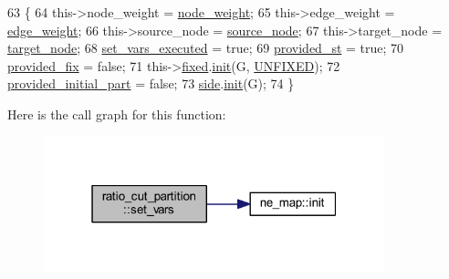 \begin{DoxyCode}
63 \{
64     this->node\_weight = \mbox{\hyperlink{classratio__cut__partition_a4d9d2a9317a062f839ea7155c37b173f}{node\_weight}};
65     this->edge\_weight = \mbox{\hyperlink{classratio__cut__partition_a48a85c82fb09b83c9d494d6d1232fab2}{edge\_weight}};
66     this->source\_node = \mbox{\hyperlink{classratio__cut__partition_abb18c3acafc590e258453d7a8d86bb49}{source\_node}};
67     this->target\_node = \mbox{\hyperlink{classratio__cut__partition_a343ba76869e64141fb795010e388744b}{target\_node}};
68     \mbox{\hyperlink{classratio__cut__partition_aa722d032cb59664894c6301ceee86729}{set\_vars\_executed}} = \textcolor{keyword}{true};
69     \mbox{\hyperlink{classratio__cut__partition_a248512624766f0b21d154b4841c95a1d}{provided\_st}} = \textcolor{keyword}{true};
70     \mbox{\hyperlink{classratio__cut__partition_a5f1f85feae589f7d39da48a412c90376}{provided\_fix}} = \textcolor{keyword}{false};
71     this->\mbox{\hyperlink{classratio__cut__partition_ad77023b9f60e88274bf54f2019404768}{fixed}}.\mbox{\hyperlink{classne__map_a4ef2ab4aebcb57a7a101975bf6a88e24}{init}}(G, \mbox{\hyperlink{classratio__cut__partition_a153cc7e51ac5d72a00671b6bdbcc6fa5}{UNFIXED}});
72     \mbox{\hyperlink{classratio__cut__partition_a963258b950f7142e3cac714353b1b21e}{provided\_initial\_part}} = \textcolor{keyword}{false};
73     \mbox{\hyperlink{classratio__cut__partition_a2bf913d1d8607747885177a3b585e611}{side}}.\mbox{\hyperlink{classne__map_a4ef2ab4aebcb57a7a101975bf6a88e24}{init}}(G);
74 \}
\end{DoxyCode}
Here is the call graph for this function\+:\nopagebreak
\begin{figure}[H]
\begin{center}
\leavevmode
\includegraphics[width=280pt]{classratio__cut__partition_aacd519cdb1760af792e22d57e746c07f_cgraph}
\end{center}
\end{figure}
\mbox{\label{classratio__cut__partition_a67ea2ccb8b5cce2e4acd8e10e112a962}} 
